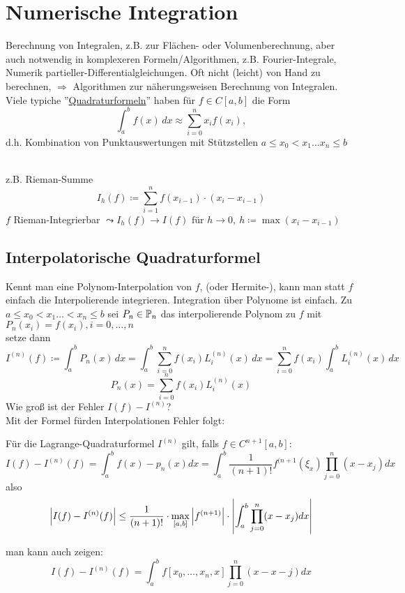 \documentclass[11pt,a4paper,oneside]{scrartcl}
\begin{document}
\section{Numerische Integration}
Berechnung von Integralen, z.B. zur Flächen- oder Volumenberechnung, 
aber auch 
notwendig in komplexeren Formeln/Algorithmen, z.B. Fourier-Integrale, 
Numerik 
partieller-Differentialgleichungen. Oft nicht (leicht) von Hand zu 
berechnen, 
\(\Rightarrow\) Algorithmen zur näherungsweisen Berechnung von 
Integralen.\\
Viele typiche ''\underline{Quadraturformeln}'' haben für \(f\in C[a,b]\)
die Form 
\[
\int^b_a f(x)\, dx \approx \sum_{i=0}^n x_i f(x_i),
\]
 d.h. Kombination von Punktauswertungen mit Stützstellen \( a\leq x_0 < 
 x_1\dots 
 x_n\leq b\)
\begin{remindexample}\hfill\\
z.B. Rieman-Summe \[
I_h(f)\coloneqq \sum_{i=1}^n f(x_{i-1})\cdot(x_i-x_{i-1})
\]
\(f\) Rieman-Integrierbar \(\leadsto I_h(f)\to I(f) \text{ für } h\to 
0, \ 
h\coloneqq \max(x_i-x_{i-1})\)\\
\end{remindexample}
\subsection{Interpolatorische Quadraturformel}
Kennt man eine Polynom-Interpolation von $f$, (oder Hermite-), kann man 
statt $f$ 
einfach die Interpolierende integrieren. Integration über Polynome ist 
einfach.
Zu \(a\leq x_0 <x_1\dots < x_n\leq b\) sei \(P_n\in\mathbb{P}_n\) das 
interpolierende 
Polynom zu \(f\) mit \(P_n(x_i)=f(x_i), i=0,\dots, n\)\\
setze dann \[
I^{(n)}(f)\coloneqq \int^b_aP_n(x)\, dx =\int^b_a \sum_{i=0}^n 
f(x_i)L^{(n)}_i(x)\, dx = \sum_{i=0}^n f(x_i)\int^b_a L^{(n)}_i(x)\, dx
\]
\[
P_n(x)=\sum_{i=0}^n f(x_i)L^{(n)}_i(x)
\]
Wie groß ist der Fehler \(I(f)-I^{(n)}\)?\\
Mit der Formel fürden Interpolationen Fehler folgt:

\begin{theorem}
    Für die Lagrange-Quadraturformel $I^{(n)}$ gilt, falls $f \in
    C^{n+1}[a,b]$:\[
        I(f) - I^{(n)}(f) = \int_a^b f(x) - p_n(x) dx = \int_a^b\frac{1}
        {(n+1)!}
        f^{(n+1}(\xi_x)\prod_{j=0}^n(x-x_j)dx
    \]
    also \[   
        \left\vert I(f) - I^{(n)}(f) \right\vert \leq \frac{1}{(n+1)!}\cdot 
        \max\limits_{[a,b]}
        \left\vert f^{(n+1)} \right\vert\cdot \left\vert \int_a^b\prod_{j=0}^n(x-x_j) dx \right\vert
    \]
\end{theorem}
\begin{remark}
    man kann auch zeigen:\[
    I(f) - I^{(n)}(f) = \int_a^b f[x_0, \dots, x_n, x] \prod_{j=0}^n(x-
    x-j)dx
    \] 
\end{remark}
\end{document}

